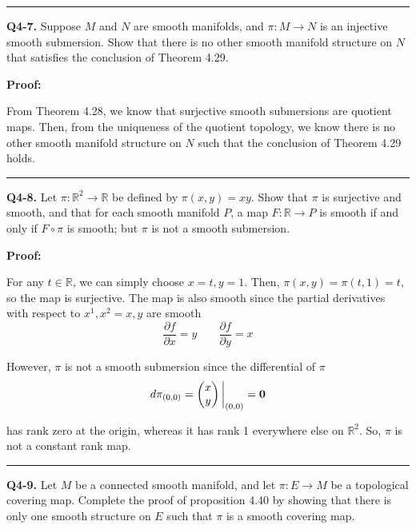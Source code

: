 \documentclass{article}
\newcommand{\R}{\mathbb{R}}
\newcommand{\restr}[2]{{%
  \left.\kern-\nulldelimiterspace %
  #1 %
  \vphantom{\big|} %
  \right|_{#2} %
  }}
\begin{document}
\vskip 0.5cm
\hrule 
\vskip 0.5cm



\textbf{Q4-7.} Suppose $M$ and $N$ are smooth manifolds, and $\pi : M \rightarrow N$ is an injective smooth submersion. Show that there is no other smooth manifold structure on $N$ that satisfies the conclusion of Theorem 4.29. 

\vskip 0.5cm
\textbf{Proof:}

From Theorem 4.28, we know that surjective smooth submersions are quotient maps. Then, from the uniqueness of the quotient topology, we know there is no other smooth manifold structure on $N$ such that the conclusion of Theorem 4.29 holds.

\vskip 0.5cm
\hrule 
\vskip 0.5cm


\textbf{Q4-8.} Let $\pi : \R^2 \rightarrow \R$ be defined by $\pi(x, y) = xy$. Show that $\pi$ is surjective and smooth, and that for each smooth manifold $P$, a map $F : \R \rightarrow P$ is smooth if and only if $F \circ \pi$ is smooth; but $\pi$ is not a smooth submersion.

\vskip 0.5cm
\textbf{Proof:}


For any $t \in \R$, we can simply choose $x = t, y = 1$. Then, $\pi(x, y) = \pi(t, 1) = t$, so the map is surjective. The map is also smooth since the partial derivatives with respect to $x^1, x^2 = x, y$ are smooth 
\[ \frac{\partial f}{\partial x} = y \;\;\;\;\;\;\; \frac{\partial f}{\partial y} = x \] 

However, $\pi$ is not a smooth submersion since the differential of $\pi$ 
\[ d\pi_{(0,0)} = \restr{\begin{pmatrix}
  x \\
  y
\end{pmatrix}}{(0,0)} = \mathbf{0} \]

has rank zero at the origin, whereas it has rank 1 everywhere else on $\R^2$. So, $\pi$ is not a constant rank map.

\vskip 0.5cm
\hrule 
\vskip 0.5cm




\textbf{Q4-9.} Let $M$ be a connected smooth manifold, and let $\pi : E \rightarrow M$ be a topological covering map. Complete the proof of proposition 4.40 by showing that there is only one smooth structure on $E$ such that $\pi$ is a smooth covering map.  
\end{document}

